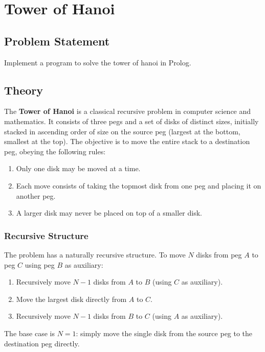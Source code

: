 \documentclass[12pt,a4paper]{report}
\begin{document}
\chapter{Tower of Hanoi}

\section{Problem Statement}
Implement a program to solve the tower of hanoi in Prolog.

\section{Theory}
The \textbf{Tower of Hanoi} is a classical recursive problem in computer science and mathematics. It consists of three pegs and a set of disks of distinct sizes, initially stacked in ascending order of size on the source peg (largest at the bottom, smallest at the top). The objective is to move the entire stack to a destination peg, obeying the following rules:

\begin{enumerate}
    \item Only one disk may be moved at a time.
    \item Each move consists of taking the topmost disk from one peg and placing it on another peg.
    \item A larger disk may never be placed on top of a smaller disk.
\end{enumerate}

\subsection{Recursive Structure}

The problem has a naturally recursive structure. To move $N$ disks from peg $A$ to peg $C$ using peg $B$ as auxiliary:

\begin{enumerate}
    \item Recursively move $N-1$ disks from $A$ to $B$ (using $C$ as auxiliary).
    \item Move the largest disk directly from $A$ to $C$.
    \item Recursively move $N-1$ disks from $B$ to $C$ (using $A$ as auxiliary).
\end{enumerate}

The base case is $N = 1$: simply move the single disk from the source peg to the destination peg directly.
\end{document}
